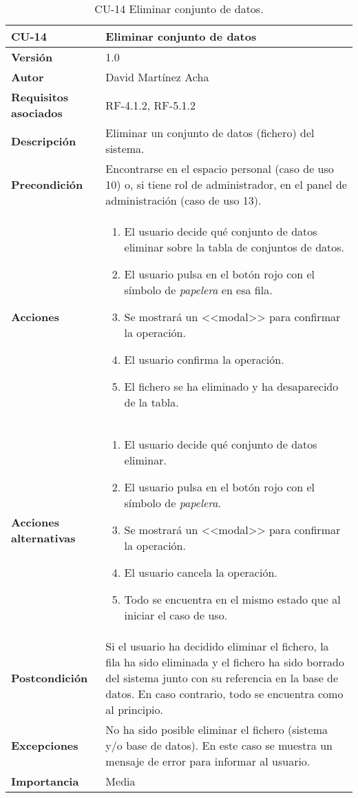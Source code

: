\begin{table}[p]
	\centering
	\begin{tabularx}{\linewidth}{ p{} p{} }
		\toprule
		\textbf{CU-14}    & \textbf{Eliminar conjunto de datos}\\
		\toprule
		\textbf{Versión}              & 1.0    \\
		\textbf{Autor}                & David Martínez Acha \\
		\textbf{Requisitos asociados} & RF-4.1.2, RF-5.1.2 \\
		\textbf{Descripción}          & Eliminar un conjunto de datos (fichero) del sistema. \\
		\textbf{Precondición}         & Encontrarse en el espacio personal (caso de uso 10) o, si tiene rol de administrador, en el panel de administración (caso de uso 13). \\
		\textbf{Acciones}             &
		\begin{enumerate}
			\def\labelenumi{\arabic{enumi}.}
			\tightlist
			\item El usuario decide qué conjunto de datos eliminar sobre la tabla de conjuntos de datos.
			\item El usuario pulsa en el botón rojo con el símbolo de \textit{papelera}  en esa fila.
			\item Se mostrará un <<modal>> para confirmar la operación.
			\item El usuario confirma la operación.
			\item El fichero se ha eliminado y ha desaparecido de la tabla.
		\end{enumerate}\\
		\textbf{Acciones alternativas}&
		\begin{enumerate}
			\def\labelenumi{\arabic{enumi}.}
			\tightlist
			\item El usuario decide qué conjunto de datos eliminar.
			\item El usuario pulsa en el botón rojo con el símbolo de \textit{papelera}.
			\item Se mostrará un <<modal>> para confirmar la operación.
			\item El usuario cancela la operación.
			\item Todo se encuentra en el mismo estado que al iniciar el caso de uso.
		\end{enumerate}\\
		\textbf{Postcondición}        & Si el usuario ha decidido eliminar el fichero, la fila ha sido eliminada y el fichero ha sido borrado del sistema junto con su referencia en la base de datos. 
		En caso contrario, todo se encuentra como al principio.\\
		\textbf{Excepciones}          & No ha sido posible eliminar el fichero (sistema y/o base de datos). En este caso se muestra un mensaje de error para informar al usuario. \\
		\textbf{Importancia}          & Media \\
		\bottomrule
	\end{tabularx}
	\caption{CU-14 Eliminar conjunto de datos.}
\end{table}


